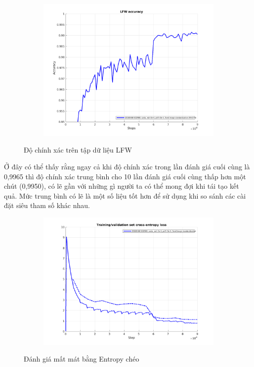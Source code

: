 \begin{figure}
    \begin{subfigure}{1\textwidth}
        \includegraphics[width=1\linewidth]{Chapters/items/accuracy.png}
        \label{fig:accuracy}
    \end{subfigure}
    \caption{Độ chính xác trên tập dữ liệu LFW}
\end{figure}

Ở đây có thể thấy rằng ngay cả khi độ chính xác trong lần đánh giá cuối cùng
là 0,9965 thì độ chính xác trung bình cho 10 lần đánh giá cuối cùng thấp
hơn một chút (0,9950), có lẽ gần với những gì người ta có thể mong đợi khi
tái tạo kết quả. Mức trung bình có lẽ là một số liệu tốt hơn để sử dụng khi
so sánh các cài đặt siêu tham số khác nhau.

\begin{figure}
    \begin{subfigure}{1.\textwidth}
        \includegraphics[width=1\linewidth]{Chapters/items/validate.png}
        \label{fig:validate}
    \end{subfigure}
    \caption{Đánh giá mất mát bằng Entropy chéo}
\end{figure}


